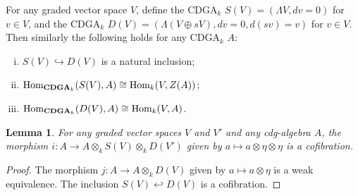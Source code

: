 \documentclass[psamsfonts]{amsart}
\newtheorem{lem}[thm]{Lemma}
\theoremstyle{definition}
\theoremstyle{remark}
\newcommand{\Hom}{\textup{Hom}}
\newcommand{\CDGA}{\mathbf{CDGA}}
\numberwithin{equation}{section}
\begin{document}
For any graded vector space $V$, define the CDGA$_k$ $S(V)=(\Lambda V,dv=0)$ for $v\in V$, and the CDGA$_k$ $D(V)=(\Lambda(V\oplus sV),dv=0,d(sv)=v)$ for $v\in V$. Then similarly the following holds for any CDGA$_k$ $A$:\begin{enumerate}[(i)]
    \item $S(V)\hookrightarrow D(V)$ is a natural inclusion;
    \item $\Hom_{\CDGA_k}(S(V),A)\cong\Hom_k(V,Z(A))$;
    \item $\Hom_{\CDGA_k}(D(V),A)\cong\Hom_k(V,A)$.
\end{enumerate}

\begin{lem}
For any graded vector spaces $V$ and $V'$ and any cdg-algebra $A$, the morphism $i:A\to A\otimes_kS(V)\otimes_kD(V')$ given by $a\mapsto a\otimes\eta\otimes\eta$ is a cofibration.
\end{lem}
\begin{proof}
The morphism $j:A\to A\otimes_kD(V)$ given by $a\mapsto a\otimes\eta$ is a weak equivalence. The inclusion $S(V)\hookleftarrow D(V)$ is a cofibration.
\end{proof}
\end{document}
